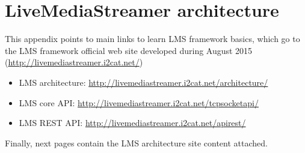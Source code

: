 \chapter{LiveMediaStreamer architecture}\label{ANX:lmsarchfull}

This appendix points to main links to learn LMS framework basics, which go to the LMS framework official web site developed during August 2015 (\url{http://livemediastreamer.i2cat.net/})

\begin{itemize}
\item LMS architecture: \url{http://livemediastreamer.i2cat.net/architecture/}
\item LMS core API: \url{http://livemediastreamer.i2cat.net/tcpsocketapi/}
\item LMS REST API: \url{http://livemediastreamer.i2cat.net/apirest/}
\end{itemize}

Finally, next pages contain the LMS architecture site content attached.

